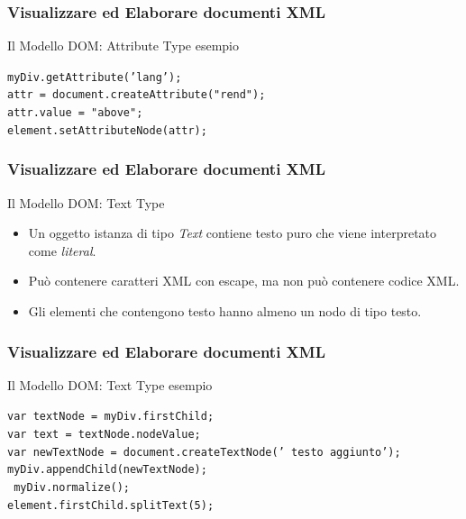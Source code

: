 \begin{frame}
    \frametitle{Visualizzare ed Elaborare documenti XML}
    \addtocounter{nframe}{1}
    
     \begin{block}{Il Modello DOM: Attribute Type esempio}

        \texttt{myDiv.getAttribute('lang');}
        \\\texttt{attr = document.createAttribute("rend");} 
        \\\texttt{attr.value = "above";} 
        \\\texttt{element.setAttributeNode(attr);}
       
     \end{block}

\end{frame}

\begin{frame}
    \frametitle{Visualizzare ed Elaborare documenti XML}
    \addtocounter{nframe}{1}

     \begin{block}{Il Modello DOM: Text Type}
        \begin{itemize}
            \item Un oggetto istanza di tipo \textit{Text} contiene testo puro che viene interpretato come \textit{literal}. 
            \item Può contenere caratteri XML con escape, ma non può contenere codice XML.
            \item Gli elementi che contengono testo hanno almeno un nodo di tipo testo.
        \end{itemize}
     \end{block}


\end{frame}

\begin{frame}
    \frametitle{Visualizzare ed Elaborare documenti XML}
    \addtocounter{nframe}{1}

     \begin{block}{Il Modello DOM: Text Type esempio}

        \texttt{var textNode = myDiv.firstChild;}
        \\\texttt{var text = textNode.nodeValue;}
        \\\texttt{var newTextNode = document.createTextNode(' testo aggiunto');}
        \\\texttt{myDiv.appendChild(newTextNode);}
        \\\texttt{ myDiv.normalize();}
        \\\texttt{element.firstChild.splitText(5);}
       
     \end{block}

\end{frame}

